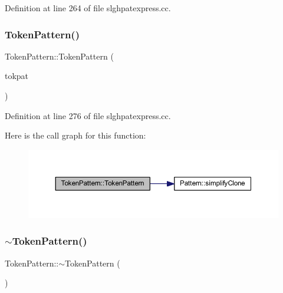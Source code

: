 Definition at line 264 of file slghpatexpress.\+cc.

\mbox{\label{class_token_pattern_ad8e3396b992b61d59d6cb64fba4a7d86}} 
\subsubsection{\texorpdfstring{TokenPattern()}{TokenPattern()}\hspace{0.1cm}{\footnotesize\ttfamily [6/6]}}
{\footnotesize\ttfamily Token\+Pattern\+::\+Token\+Pattern (\begin{DoxyParamCaption}\item[{const \mbox{\hyperlink{class_token_pattern}{Token\+Pattern}} \&}]{tokpat }\end{DoxyParamCaption})}



Definition at line 276 of file slghpatexpress.\+cc.

Here is the call graph for this function\+:
\nopagebreak
\begin{figure}[H]
\begin{center}
\leavevmode
\includegraphics[width=350pt]{class_token_pattern_ad8e3396b992b61d59d6cb64fba4a7d86_cgraph}
\end{center}
\end{figure}
\mbox{\label{class_token_pattern_aafc7a965aab9d0d34a5b35e0f272c735}} 
\subsubsection{\texorpdfstring{$\sim$TokenPattern()}{~TokenPattern()}}
{\footnotesize\ttfamily Token\+Pattern\+::$\sim$\+Token\+Pattern (\begin{DoxyParamCaption}\item[{void}]{ }\end{DoxyParamCaption})\hspace{0.3cm}{\ttfamily [inline]}}



